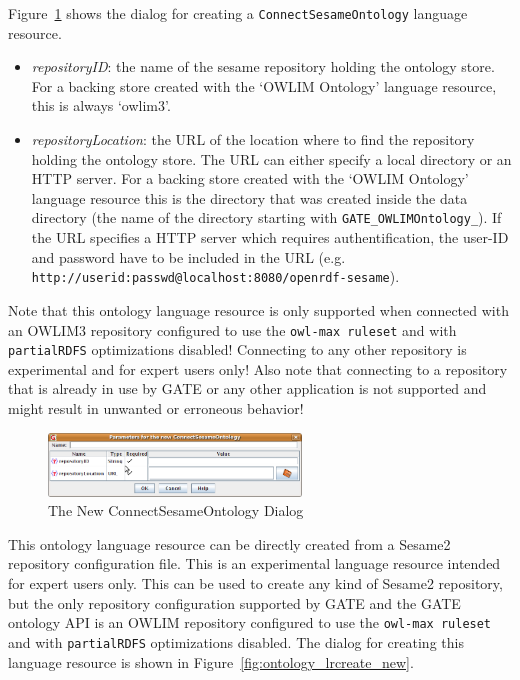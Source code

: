Figure~\ref{fig:ontology_lrconn_new} shows the dialog for creating a
\texttt{ConnectSesameOntology} language resource.
\begin{itemize}
 \item \emph{repositoryID}: the name of the sesame repository holding the ontology store.
 For a backing store created with the `OWLIM Ontology' language resource, this
 is always `owlim3'. 
 \item \emph{repositoryLocation}: the URL of the location where to find the repository
 holding the ontology store. The URL can either specify a local directory or 
 an HTTP server. For a backing store created with the `OWLIM Ontology'
 language resource this is the directory that was created inside the data directory
 (the name of the directory starting with \verb!GATE_OWLIMOntology_!). 
 If the URL specifies a HTTP server which requires authentification, the user-ID
 and password have to be included in the URL (e.g. \verb!http://userid:passwd@localhost:8080/openrdf-sesame!).

\end{itemize}

Note that this ontology language resource is only supported when connected with
an OWLIM3 repository configured to use the \texttt{owl-max ruleset} and with
\texttt{partialRDFS} optimizations disabled! Connecting to any other repository
is experimental and for expert users only! Also note that connecting to a
repository that is already in use by GATE or any other application is not
supported and might result in unwanted or erroneous behavior!

\begin{figure}[htbp]
\begin{center}
\includegraphics[width=0.6\textwidth]{ontology_lrconn_new.png}
\caption{The New ConnectSesameOntology Dialog}
\label{fig:ontology_lrconn_new}
\end{center}
\end{figure}



This ontology language resource can be directly created from a Sesame2
repository configuration file. This is an experimental language resource 
intended for expert users only. This can be used to create any kind 
of Sesame2 repository, but the only repository configuration supported 
by GATE and the GATE ontology API is an OWLIM repository configured to use 
the \texttt{owl-max ruleset} and with \texttt{partialRDFS} optimizations
disabled.  The dialog for creating this language resource is shown in
Figure~\ref{fig:ontology_lrcreate_new}.

